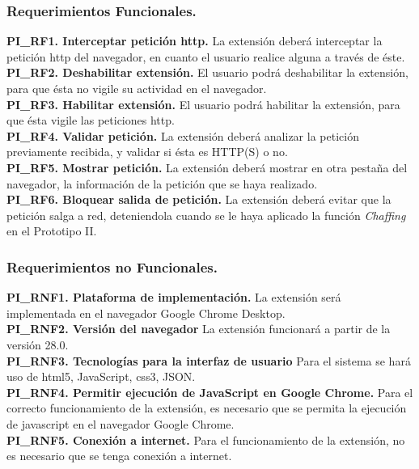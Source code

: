 \documentclass[12pt, a4paper, titlepage]{report}
\begin{document}
				\subsubsection{Requerimientos Funcionales.}
				{\setlength{\parindent}{12pt}
				\textbf{PI\_RF1. Interceptar petición \acrshort{http}.} La extensión deberá interceptar la petición \acrshort{http} del navegador, en cuanto el usuario realice alguna a través de éste.\\

				\textbf{PI\_RF2. Deshabilitar extensión.} El usuario podrá deshabilitar la extensión, para que ésta no vigile su actividad en el navegador.\\
				
				\textbf{PI\_RF3. Habilitar extensión.} El usuario podrá habilitar la extensión, para que ésta vigile las peticiones \acrshort{http}.\\
				
				\textbf{PI\_RF4. Validar petición.} La extensión deberá analizar la petición previamente recibida, y validar si ésta es HTTP(S) o no.\\
				
				\textbf{PI\_RF5. Mostrar petición.} La extensión deberá mostrar en otra pestaña del navegador, la información de la petición que se haya realizado.\\
				
				\textbf{PI\_RF6. Bloquear salida de petición.} La extensión deberá evitar que la petición salga a red, deteniendola cuando se le haya aplicado la función \textit{Chaffing} en el Prototipo II. 
		        }
				
				\subsubsection{Requerimientos no Funcionales.}
				{\setlength{\parindent}{12pt}
				
				\textbf{PI\_RNF1. Plataforma de implementación.} La extensión será implementada en el navegador Google Chrome Desktop.\\
				
				\textbf{PI\_RNF2. Versión del navegador} La extensión funcionará a partir de la versión 28.0.\\
				
				\textbf{PI\_RNF3. Tecnologías para la interfaz de usuario} Para el sistema se hará uso de html5, JavaScript, css3, JSON.\\
				
				\textbf{PI\_RNF4. Permitir ejecución de JavaScript en Google Chrome.} Para el correcto funcionamiento de la extensión, es necesario que se permita la ejecución de javascript en el navegador Google Chrome.\\
				
				\textbf{PI\_RNF5. Conexión a internet.} Para el funcionamiento de la extensión, no es necesario que se tenga conexión a internet.
				}
			
\end{document}
